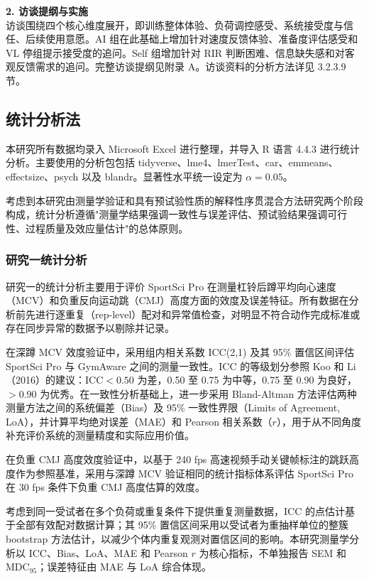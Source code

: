 \documentclass[UTF8,zihao=-4,twoside,openany]{ctexbook}
\begin{document}
\vspace{0.2cm}
\noindent \textbf{2. 访谈提纲与实施} \\
访谈围绕四个核心维度展开，即训练整体体验、负荷调控感受、系统接受度与信任、后续使用意愿。AI 组在此基础上增加针对速度反馈体验、准备度评估感受和 VL 停组提示接受度的追问。Self 组增加针对 RIR 判断困难、信息缺失感和对客观反馈需求的追问。完整访谈提纲见附录 A。访谈资料的分析方法详见 3.2.3.9 节。

\subsection{统计分析法}
本研究所有数据均录入 Microsoft Excel 进行整理，并导入 R 语言 4.4.3 进行统计分析。主要使用的分析包包括 tidyverse、lme4、lmerTest、car、emmeans、effectsize、psych 以及 blandr。显著性水平统一设定为 $\alpha = 0.05$。

考虑到本研究由测量学验证和具有预试验性质的解释性序贯混合方法研究两个阶段构成，统计分析遵循"测量学结果强调一致性与误差评估、预试验结果强调可行性、过程质量及效应量估计"的总体原则。

\subsubsection{研究一统计分析}
研究一的统计分析主要用于评价 SportSci Pro 在测量杠铃后蹲平均向心速度（MCV）和负重反向运动跳（CMJ）高度方面的效度及误差特征。所有数据在分析前先进行逐重复（rep-level）配对和异常值检查，对明显不符合动作完成标准或存在同步异常的数据予以剔除并记录。

在深蹲 MCV 效度验证中，采用组内相关系数 ICC(2,1) 及其 95\% 置信区间评估 SportSci Pro 与 GymAware 之间的测量一致性。ICC 的等级划分参照 Koo 和 Li（2016）的建议：$\text{ICC} < 0.50$ 为差，0.50 至 0.75 为中等，0.75 至 0.90 为良好，$> 0.90$ 为优秀。在一致性分析基础上，进一步采用 Bland-Altman 方法评估两种测量方法之间的系统偏差（Bias）及 95\% 一致性界限（Limits of Agreement, LoA），并计算平均绝对误差（MAE）和 Pearson 相关系数（$r$），用于从不同角度补充评价系统的测量精度和实际应用价值。

在负重 CMJ 高度效度验证中，以基于 240 fps 高速视频手动关键帧标注的跳跃高度作为参照基准，采用与深蹲 MCV 验证相同的统计指标体系评估 SportSci Pro 在 30 fps 条件下负重 CMJ 高度估算的效度。

考虑到同一受试者在多个负荷或重复条件下提供重复测量数据，ICC 的点估计基于全部有效配对数据计算；其 95\% 置信区间采用以受试者为重抽样单位的整簇 bootstrap 方法估计，以减少个体内重复观测对置信区间的影响。本研究测量学分析以 ICC、Bias、LoA、MAE 和 Pearson $r$ 为核心指标，不单独报告 SEM 和 $\text{MDC}_{95}$；误差特征由 MAE 与 LoA 综合体现。
\end{document}
